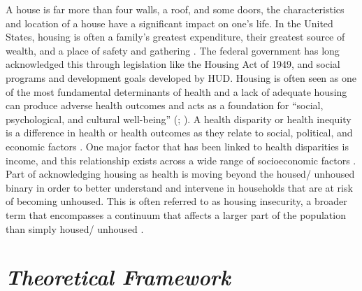 A house is far more than four walls, a roof, and some doors, the characteristics and location of a house have a significant impact on one’s life. In the United States, housing is often a family’s greatest expenditure, their greatest source of wealth, and a place of safety and gathering \citep{braveman_housing_2011}. The federal government has long acknowledged this through legislation like the Housing Act of 1949, and social programs and development goals developed by HUD. Housing is often seen as one of the most fundamental determinants of health and a lack of adequate housing can produce adverse health outcomes and acts as a foundation for “social, psychological, and cultural well-being” (\citealp[p.17]{dalessandro_housing_2020}; \citealp{leifheit_building_2022}).  A health disparity or health inequity is a difference in health or health outcomes as they relate to social, political, and economic factors \citep{lutfiyya_rurality_2012}. One major factor that has been linked to health disparities is income, and this relationship exists across a wide range of socioeconomic factors \citep{canto_rural_2014}.  Part of acknowledging housing as health is moving beyond the housed/ unhoused binary in order to better understand and intervene in households that are at risk of becoming unhoused. This is often referred to as housing insecurity, a broader term that encompasses a continuum that affects a larger part of the population than simply housed/ unhoused \citep{deluca_housing_2022}.

\section{\textit{Theoretical Framework}}

